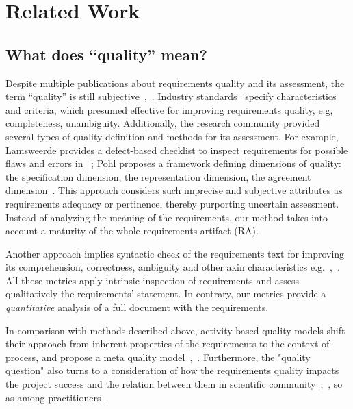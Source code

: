 \section{Related Work}
\label{sec:relatedwork} 

\subsection{What does ``quality'' mean?}

Despite multiple publications about requirements quality and its assessment, 
the term ``quality'' is still subjective~\cite{Mund:2017},~\cite{Femmer:2017}. 
Industry standards~\cite{ISO/IEC/IEEE:2011} specify characteristics and criteria, 
which presumed effective for improving requirements quality, e.g, completeness, unambiguity. 
Additionally, the research community provided several types of quality definition and methods for its assessment. 
For example, Lamsweerde provides a defect-based checklist to inspect requirements for possible flaws 
and errors in ~\cite{Lamsweerde:2009}; Pohl proposes a framework defining dimensions of quality: 
the specification dimension, the representation dimension, the agreement dimension~\cite{POHL:1994}.
This approach considers such imprecise and subjective attributes as requirements adequacy or pertinence, thereby purporting uncertain assessment.
Instead of analyzing the meaning of the requirements, our method takes into account a maturity of the whole requirements artifact (RA).


Another approach implies syntactic check of the requirements text for improving its comprehension, 
correctness, ambiguity and other akin characteristics e.g.~\cite{Ferrari:2014},~\cite{Berry:2006}.
All these metrics apply intrinsic inspection of requirements and assess qualitatively the requirements' statement. 
In contrary, our metrics provide a \textit{quantitative} analysis of a full document with the requirements.

In comparison with methods described above, activity-based quality models shift their approach from inherent properties of the requirements 
to the context of process, and propose a meta quality model~\cite{Wagner:2012},~\cite{Femmer:2015}. 
Furthermore, the "quality question" also turns to a consideration of how the requirements quality impacts the project success and the relation between 
them in scientific community~\cite{Emam:1995},~\cite{Kamata:2007}, so as among practitioners~\cite{BeattyHokanson:2014}.

